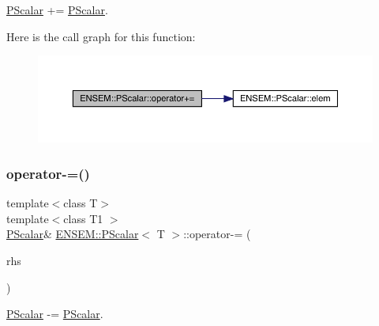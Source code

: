 \mbox{\hyperlink{classENSEM_1_1PScalar}{P\+Scalar}} += \mbox{\hyperlink{classENSEM_1_1PScalar}{P\+Scalar}}. 

Here is the call graph for this function\+:
\nopagebreak
\begin{figure}[H]
\begin{center}
\leavevmode
\includegraphics[width=350pt]{d3/d27/classENSEM_1_1PScalar_a9c8d9e51f9d0a13b4b4aa9992812eea8_cgraph}
\end{center}
\end{figure}
\mbox{\label{classENSEM_1_1PScalar_a8c0e633dbd87bcb922496bfaf136752c}} 
\subsubsection{\texorpdfstring{operator-\/=()}{operator-=()}\hspace{0.1cm}{\footnotesize\ttfamily [1/3]}}
{\footnotesize\ttfamily template$<$class T$>$ \\
template$<$class T1 $>$ \\
\mbox{\hyperlink{classENSEM_1_1PScalar}{P\+Scalar}}\& \mbox{\hyperlink{classENSEM_1_1PScalar}{E\+N\+S\+E\+M\+::\+P\+Scalar}}$<$ T $>$\+::operator-\/= (\begin{DoxyParamCaption}\item[{const \mbox{\hyperlink{classENSEM_1_1PScalar}{P\+Scalar}}$<$ T1 $>$ \&}]{rhs }\end{DoxyParamCaption})\hspace{0.3cm}{\ttfamily [inline]}}



\mbox{\hyperlink{classENSEM_1_1PScalar}{P\+Scalar}} -\/= \mbox{\hyperlink{classENSEM_1_1PScalar}{P\+Scalar}}. 

